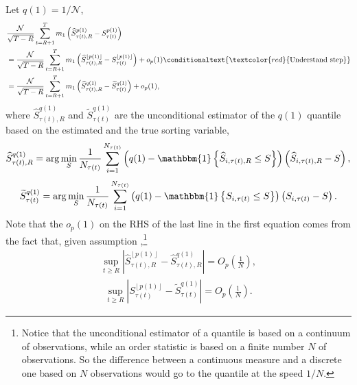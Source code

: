 Let $q(1)=1/\mathcal{N}$,
\begin{align*}
&\frac{\mathcal{N}}{\sqrt{T-R}} \sum_{t=R+1}^{T} m_{1}\left( \widehat{S}_{\tau(t),R}^{p(1)} - S_{\tau(t)}^{p(1)}\right) \\
&=\frac{\mathcal{N}}{\sqrt{T-R}} \sum_{t=R+1}^{T} m_{1}\left( \widehat{S}_{\tau(t),R}^{\left \lfloor p(1) \right \rfloor }- S_{\tau(t)}^{\left\lfloor p(1)\right\rfloor }\right) +o_{p}(1) \conditionaltext{\textcolor{red}{\text{Understand step}}} \\
&=\frac{\mathcal{N}}{\sqrt{T-R}} \sum_{t=R+1}^{T} m_{1} \left( \widehat{S}_{\tau(t),R}^{q(1)} - \widetilde{S}_{\tau(t)}^{q(1)} \right) +o_{p}(1), 
\end{align*}
where $\widehat{S}_{\tau(t),R}^{q(1)}$ and $\widetilde{S}_{\tau(t)}^{q(1)}$ are the unconditional estimator of the $q(1)$ quantile based on the estimated and the true sorting variable, %
\begin{align*}
\widehat{S}_{\tau(t),R}^{q(1)} = \arg \min_{S} \frac{1}{N_{\tau(t)}} \sum_{i=1}^{N_{\tau(t)}} \left( q(1) - \mathbbm{1} \left\{ \widehat{S}_{i,\tau(t),R} \leq S \right\} \right) \left( \widehat{S}_{i,\tau(t),R}- S \right), %
\end{align*}
\begin{align*}
\widetilde{S}_{\tau(t)}^{q(1)}=\arg \min_{S}\frac{1}{N_{\tau(t)}} \sum_{i=1}^{N_{\tau(t)}} \left( q(1) - \mathbbm{1} \left\{ S_{i,\tau(t)} \leq S \right\} \right) \left( S_{i,\tau(t)}-S\right). 
\end{align*}
Note that the $o_{p}(1)$ on the RHS of the last line in the first equation comes from the fact that, given assumption ,\footnote{Notice that the unconditional estimator of a quantile is based on a continuum of observations, while an order statistic is based on a finite number $N$ of observations. So the difference between a continuous measure and a discrete one based on $N$ observations would go to the quantile at the speed $1/N$.}
\begin{align*}
\sup_{t\geq R}\left\vert \widehat{S}_{\tau(t),R}^{\left\lfloor p(1)\right\rfloor }-\widehat{S}_{\tau(t),R}^{q(1)}\right\vert =O_{p}\left( \frac{1}{N}\right),
\end{align*}
\begin{align*}
\sup_{t\geq R}\left\vert S_{\tau(t)}^{\left\lfloor p(1)\right\rfloor }-\widetilde{S}_{\tau(t)}^{q(1)}\right\vert =O_{p}\left( \frac{1}{N} \right).
\end{align*}

